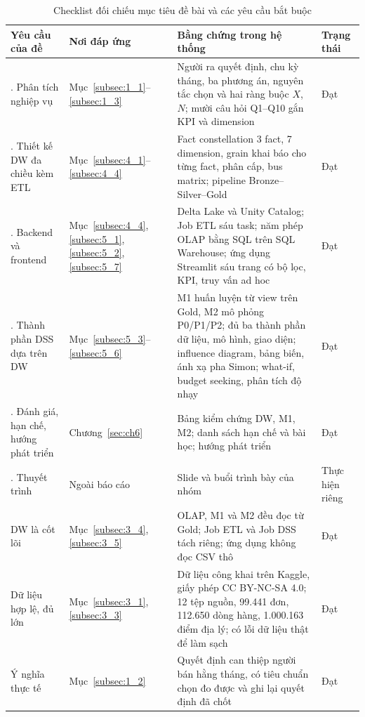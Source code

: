 \documentclass[a4paper]{article}
\begin{document}
\begin{table}[htbp]
\centering
\footnotesize
\setlength{\tabcolsep}{3pt}
\renewcommand{\arraystretch}{1.08}
\caption{Checklist đối chiếu mục tiêu đề bài và các yêu cầu bắt buộc}
\label{tab:rtm_checklist}
\begin{tabularx}{\textwidth}{@{}>{\raggedright\arraybackslash}p{3.3cm}>{\raggedright\arraybackslash}p{1.9cm}>{\raggedright\arraybackslash}X>{\raggedright\arraybackslash}p{1.9cm}@{}}
\toprule
\textbf{Yêu cầu của đề} & \textbf{Nơi đáp ứng} & \textbf{Bằng chứng trong hệ thống} & \textbf{Trạng thái} \\
\midrule
1. Phân tích nghiệp vụ & Mục~\ref{subsec:1_1}--\ref{subsec:1_3} & Người ra quyết định, chu kỳ tháng, ba phương án, nguyên tắc chọn và hai ràng buộc $X$, $N$; mười câu hỏi Q1--Q10 gắn KPI và dimension & Đạt \\
\addlinespace
2. Thiết kế DW đa chiều kèm ETL & Mục~\ref{subsec:4_1}--\ref{subsec:4_4} & Fact constellation 3 fact, 7 dimension, grain khai báo cho từng fact, phân cấp, bus matrix; pipeline Bronze--Silver--Gold & Đạt \\
\addlinespace
3. Backend và frontend & Mục~\ref{subsec:4_4}, \ref{subsec:5_1}, \ref{subsec:5_2}, \ref{subsec:5_7} & Delta Lake và Unity Catalog; Job ETL sáu task; năm phép OLAP bằng SQL trên SQL Warehouse; ứng dụng Streamlit sáu trang có bộ lọc, KPI, truy vấn ad hoc & Đạt \\
\addlinespace
4. Thành phần DSS dựa trên DW & Mục~\ref{subsec:5_3}--\ref{subsec:5_6} & M1 huấn luyện từ view trên Gold, M2 mô phỏng P0/P1/P2; đủ ba thành phần dữ liệu, mô hình, giao diện; influence diagram, bảng biến, ánh xạ pha Simon; what-if, budget seeking, phân tích độ nhạy & Đạt \\
\addlinespace
5. Đánh giá, hạn chế, hướng phát triển & Chương~\ref{sec:ch6} & Bảng kiểm chứng DW, M1, M2; danh sách hạn chế và bài học; hướng phát triển & Đạt \\
\addlinespace
6. Thuyết trình & Ngoài báo cáo & Slide và buổi trình bày của nhóm & Thực hiện riêng \\
\midrule
DW là cốt lõi & Mục~\ref{subsec:3_4}, \ref{subsec:3_5} & OLAP, M1 và M2 đều đọc từ Gold; Job ETL và Job DSS tách riêng; ứng dụng không đọc CSV thô & Đạt \\
\addlinespace
Dữ liệu hợp lệ, đủ lớn & Mục~\ref{subsec:3_1}, \ref{subsec:3_3} & Dữ liệu công khai trên Kaggle, giấy phép CC BY-NC-SA 4.0; 12 tệp nguồn, 99.441 đơn, 112.650 dòng hàng, 1.000.163 điểm địa lý; có lỗi dữ liệu thật để làm sạch & Đạt \\
\addlinespace
Ý nghĩa thực tế & Mục~\ref{subsec:1_2} & Quyết định can thiệp người bán hằng tháng, có tiêu chuẩn chọn đo được và ghi lại quyết định đã chốt & Đạt \\
\bottomrule
\end{tabularx}
\end{table}
\end{document}
